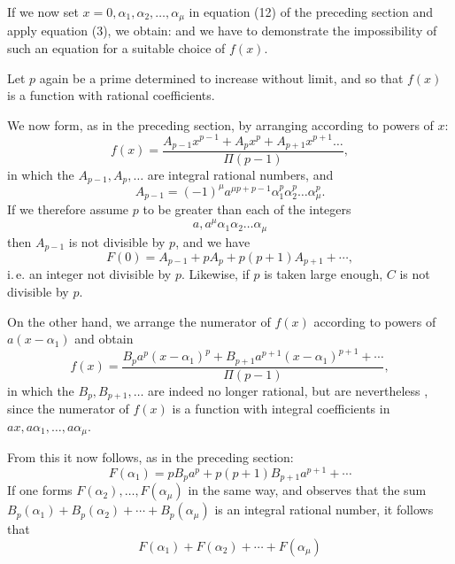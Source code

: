 
If we now set $x=0,\alpha_1,\alpha_2,\ldots,\alpha_\mu$ in equation (12) of the preceding section and apply equation (3), we obtain:
and we have to demonstrate the impossibility of such an equation for a suitable choice of $f(x)$.

Let $p$ again be a prime determined to increase without limit, and
so that $f(x)$ is a function with rational coefficients.

We now form, as in the preceding section, by arranging according to powers of $x$:
\[
f(x) = \dfrac{A_{p-1}x^{p-1} + A_px^p + A_{p+1}x^{p+1}\ldots}{\Pi(p-1)},
\]
in which the $A_{p-1},A_p,\ldots$ are integral rational numbers, and
\[
A_{p-1} = (-1)^\mu a^{\mu p+p-1}\alpha_1^p\alpha_2^p\ldots\alpha_\mu^p.
\]
If we therefore assume $p$ to be greater than each of the integers
\[
a, a^\mu\alpha_1\alpha_2\ldots\alpha_\mu
\]
then $A_{p-1}$ is not divisible by $p$, and we have
\[
F(0) = A_{p-1} + pA_p + p(p+1)A_{p+1} + \cdots,
\]
i.\,e. an integer not divisible by $p$. Likewise, if $p$ is taken large enough, $C$ is not divisible by $p$.

On the other hand, we arrange the numerator of $f(x)$ according to powers of $a(x-\alpha_1)$ and obtain
\[
f(x) = \dfrac{B_pa^p(x-\alpha_1)^p + B_{p+1}a^{p+1}(x-\alpha_1)^{p+1} + \cdots}{\Pi(p-1)},
\]
in which the $B_p,B_{p+1},\ldots$ are indeed no longer rational, but are nevertheless , since the numerator of $f(x)$ is a function with integral coefficients in $ax,a\alpha_1,\ldots,a\alpha_\mu$.

From this it now follows, as in the preceding section:
\[
F(\alpha_1) = pB_pa^p + p(p+1)B_{p+1}a^{p+1} + \cdots
\]
If one forms $F(\alpha_2),\ldots,F(\alpha_\mu)$ in the same way, and observes that the sum $B_p(\alpha_1)+B_p(\alpha_2)+\cdots+B_p(\alpha_\mu)$ is an integral rational number, it follows that
\[
F(\alpha_1) + F(\alpha_2) + \cdots + F(\alpha_\mu)
\]
